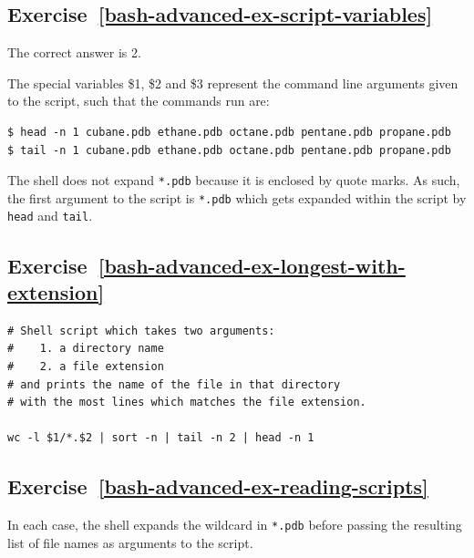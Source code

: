 \documentclass[
]{krantz}
\begin{document}
\hypertarget{exercise-refbash-advanced-ex-script-variables}{%
\subsection*{Exercise~\ref{bash-advanced-ex-script-variables}}\label{exercise-refbash-advanced-ex-script-variables}}


The correct answer is 2.

The special variables \$1, \$2 and \$3 represent the command line arguments given to the
script, such that the commands run are:

\begin{verbatim}
$ head -n 1 cubane.pdb ethane.pdb octane.pdb pentane.pdb propane.pdb
$ tail -n 1 cubane.pdb ethane.pdb octane.pdb pentane.pdb propane.pdb
\end{verbatim}

The shell does not expand \texttt{\textquotesingle{}*.pdb\textquotesingle{}} because it is enclosed by quote marks.
As such, the first argument to the script is \texttt{\textquotesingle{}*.pdb\textquotesingle{}} which gets expanded within the
script by \texttt{head} and \texttt{tail}.

\hypertarget{exercise-refbash-advanced-ex-longest-with-extension}{%
\subsection*{Exercise~\ref{bash-advanced-ex-longest-with-extension}}\label{exercise-refbash-advanced-ex-longest-with-extension}}


\begin{verbatim}
# Shell script which takes two arguments:
#    1. a directory name
#    2. a file extension
# and prints the name of the file in that directory
# with the most lines which matches the file extension.

wc -l $1/*.$2 | sort -n | tail -n 2 | head -n 1
\end{verbatim}

\hypertarget{exercise-refbash-advanced-ex-reading-scripts}{%
\subsection*{Exercise~\ref{bash-advanced-ex-reading-scripts}}\label{exercise-refbash-advanced-ex-reading-scripts}}


In each case, the shell expands the wildcard in \texttt{*.pdb} before passing the resulting
list of file names as arguments to the script.
\end{document}
